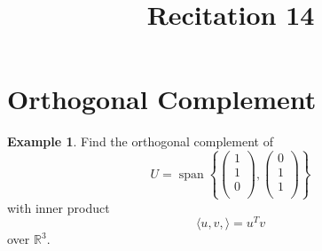 \documentclass[fleqn, a4paper, 12pt]{article}
\title{Recitation 14}
\author{}
\date{\formatdate{21}{1}{2015}}
\theoremstyle{definition}
\newtheorem{example}{Example}
\theoremstyle{theorem}
\DeclareMathOperator{\vspan}{\mathrm{span}} %
\begin{document}
\maketitle

\tableofcontents

\newpage
\section{Orthogonal Complement}

\begin{example}
	Find the orthogonal complement of 
	\begin{equation*}
		U = \vspan
			\left\lbrace
				\begin{pmatrix}
					1\\
					1\\
					0\\
				\end{pmatrix}
				,
				\begin{pmatrix}
					0\\
					1\\
					1\\
				\end{pmatrix}
			\right\rbrace
	\end{equation*}
	with inner product
	\begin{equation*}
		\langle u, v, \rangle = u^T v
	\end{equation*}
	over $\mathbb{R}^3$.
\end{example}
\end{document}

